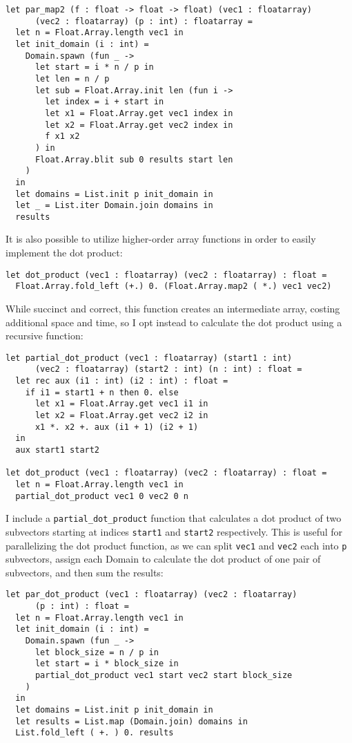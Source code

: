 \documentclass[pageno]{jpaper}
\begin{document}
\begin{doublespacing}
\begin{verbatim}
let par_map2 (f : float -> float -> float) (vec1 : floatarray) 
      (vec2 : floatarray) (p : int) : floatarray = 
  let n = Float.Array.length vec1 in
  let init_domain (i : int) =
    Domain.spawn (fun _ ->
      let start = i * n / p in
      let len = n / p
      let sub = Float.Array.init len (fun i ->
        let index = i + start in
        let x1 = Float.Array.get vec1 index in
        let x2 = Float.Array.get vec2 index in
        f x1 x2
      ) in
      Float.Array.blit sub 0 results start len
    )
  in
  let domains = List.init p init_domain in
  let _ = List.iter Domain.join domains in
  results
\end{verbatim}

It is also possible to utilize higher-order array functions in order to easily implement the dot product:

\begin{verbatim}
let dot_product (vec1 : floatarray) (vec2 : floatarray) : float = 
  Float.Array.fold_left (+.) 0. (Float.Array.map2 ( *.) vec1 vec2)
\end{verbatim}

While succinct and correct, this function creates an intermediate array, costing additional space and time, so I opt instead to calculate the dot product using a recursive function:

\begin{verbatim}
let partial_dot_product (vec1 : floatarray) (start1 : int)
      (vec2 : floatarray) (start2 : int) (n : int) : float = 
  let rec aux (i1 : int) (i2 : int) : float = 
    if i1 = start1 + n then 0. else
      let x1 = Float.Array.get vec1 i1 in
      let x2 = Float.Array.get vec2 i2 in
      x1 *. x2 +. aux (i1 + 1) (i2 + 1)
  in
  aux start1 start2

let dot_product (vec1 : floatarray) (vec2 : floatarray) : float =
  let n = Float.Array.length vec1 in
  partial_dot_product vec1 0 vec2 0 n
\end{verbatim}

I include a \verb|partial_dot_product| function that calculates a dot product of two subvectors starting at indices \verb|start1| and \verb|start2| respectively. This is useful for parallelizing the dot product function, as we can split \verb|vec1| and \verb|vec2| each into \verb|p| subvectors, assign each Domain to calculate the dot product of one pair of subvectors, and then sum the results:

\begin{verbatim}
let par_dot_product (vec1 : floatarray) (vec2 : floatarray)
      (p : int) : float =
  let n = Float.Array.length vec1 in
  let init_domain (i : int) =
    Domain.spawn (fun _ -> 
      let block_size = n / p in
      let start = i * block_size in
      partial_dot_product vec1 start vec2 start block_size
    )
  in 
  let domains = List.init p init_domain in
  let results = List.map (Domain.join) domains in
  List.fold_left ( +. ) 0. results
\end{verbatim}


\end{doublespacing}
\end{document}
